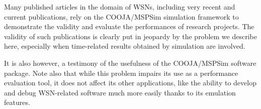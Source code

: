 \documentclass[a4paper,10pt]{article}
\begin{document}
Many published articles in the domain of WSNs, including very recent
and current publications, rely on the COOJA/MSPSim simulation framework
to demonstrate the validity and evaluate the performances of research
projects. The validity of such publications is clearly put in jeopardy
by the problem we describe here, especially when time-related results
obtained by simulation are involved.

It is also however, a testimony of the usefulness of the COOJA/MSPSim
software package. Note also that while this problem impairs its use
as a performance evaluation tool, it does not affect its other applications,
like the ability to develop and debug WSN-related software much more easily
thanks to its emulation features.



\vfill

{\small
}
\end{document}
